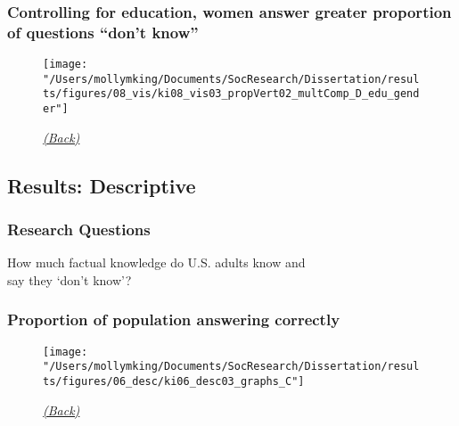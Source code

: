 \documentclass[pdf]{beamer}
\begin{document}
\begin{frame}
\label{dontknow_barChart}
\frametitle{Controlling for education, women answer greater proportion of questions ``don't know''}
  \begin{figure}[ht]
    \begin{center}
      \texttt{[image: "/Users/mollymking/Documents/SocResearch/Dissertation/results/figures/08\_vis/ki08\_vis03\_propVert02\_multComp\_D\_edu\_gender"]}
    \end{center}
    \begin{flushright}
      \emph{\scriptsize{\textcolor{gray}{\hyperlink{supplemental_slides}{(Back)}}}}
    \end{flushright}
  \end{figure}
\end{frame}


\subsection{Results: Descriptive}

\begin{frame}
\label{descriptive_correct}
\frametitle{Research Questions}
  How much factual knowledge do U.S. adults know and \\say they `don't know'? \\
\end{frame}

\begin{frame}
\frametitle{Proportion of population answering correctly}
\begin{figure}[ht]
  \begin{center}
    \texttt{[image: "/Users/mollymking/Documents/SocResearch/Dissertation/results/figures/06\_desc/ki06\_desc03\_graphs\_C"]}
  \end{center}
  \begin{flushright}
    \emph{\scriptsize{\textcolor{gray}{\hyperlink{supplemental_slides}{(Back)}}}}
  \end{flushright}
\end{figure}
  \note[item]{}
\end{frame}
\end{document}
